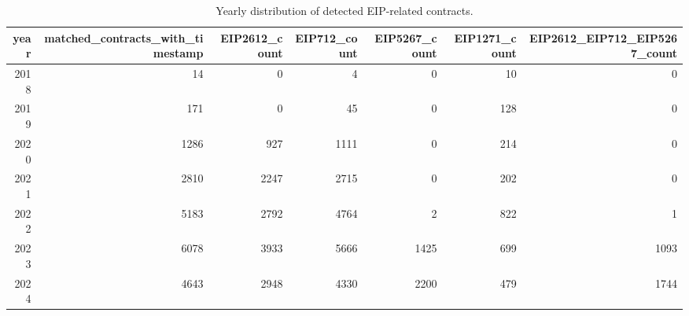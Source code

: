 \begin{table}
\caption{Yearly distribution of detected EIP-related contracts.}
\label{tab:eip-adoption-yearly}
\begin{tabular}{rrrrrrr}
\toprule
year & matched_contracts_with_timestamp & EIP2612_count & EIP712_count & EIP5267_count & EIP1271_count & EIP2612_EIP712_EIP5267_count \\
\midrule
2018 & 14 & 0 & 4 & 0 & 10 & 0 \\
2019 & 171 & 0 & 45 & 0 & 128 & 0 \\
2020 & 1286 & 927 & 1111 & 0 & 214 & 0 \\
2021 & 2810 & 2247 & 2715 & 0 & 202 & 0 \\
2022 & 5183 & 2792 & 4764 & 2 & 822 & 1 \\
2023 & 6078 & 3933 & 5666 & 1425 & 699 & 1093 \\
2024 & 4643 & 2948 & 4330 & 2200 & 479 & 1744 \\
\bottomrule
\end{tabular}
\end{table}
